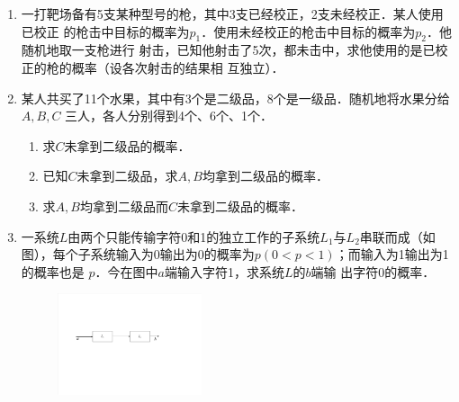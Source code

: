\documentclass[10pt,a4paper]{article}
\begin{document}
\begin{enumerate}





        






    \item 一打靶场备有5支某种型号的枪，其中3支已经校正，2支未经校正．某人使用已校正
    的枪击中目标的概率为$p_1$．使用未经校正的枪击中目标的概率为$p_2$．他随机地取一支枪进行
    射击，已知他射击了5次，都未击中，求他使用的是已校正的枪的概率（设各次射击的结果相
    互独立）．



    \item 某人共买了11个水果，其中有3个是二级品，8个是一级品．随机地将水果分给$A,B,C$
    三人，各人分别得到4个、6个、1个．
    \begin{enumerate}
        \item 求$C$未拿到二级品的概率．
        \item 已知$C$未拿到二级品，求$A,B$均拿到二级品的概率．
        \item 求$A,B$均拿到二级品而$C$未拿到二级品的概率．
    \end{enumerate}



    \item 一系统$L$由两个只能传输字符0和1的独立工作的子系统$L_1$与$L_2$串联而成（如
    图），每个子系统输入为0输出为0的概率为$p(0<p<1)$；而输入为1输出为1的概率也是
    $p$．今在图中$a$端输入字符1，求系统$L$的$b$端输
    出字符0的概率．
    \begin{figure}[H]
        \flushright 
        \includegraphics[width=0.4\textwidth]{3.pdf}
    \end{figure}
    \vspace{-0.5cm}




\end{enumerate}
\end{document}
